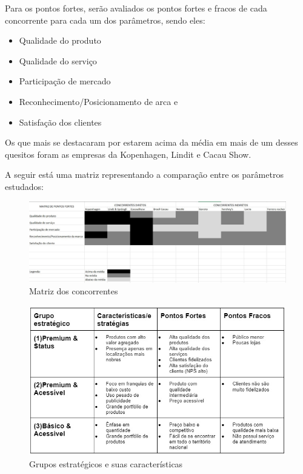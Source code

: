 \documentclass[
	12pt,				%
	openright,			%
	oneside,			%
	a4paper,			%
	english,			%
	french,				%
	spanish,			%
	brazil				%
	]{abntex2}
\begin{document}
Para os pontos fortes, serão avaliados os pontos fortes e fracos de cada concorrente para cada um dos parâmetros, sendo eles:
\begin{itemize}
\item Qualidade do produto
\item Qualidade do serviço
\item Participação de mercado
\item Reconhecimento/Posicionamento de arca e
\item Satisfação dos clientes
\end{itemize}
Os que mais se destacaram por estarem acima da média em mais de um desses quesitos foram as empresas da Kopenhagen, Lindit e Cacau Show.

A seguir está uma matriz representando a comparação entre os parâmetros estudados:

\begin{figure}[H]
\begin{center}
\caption{Matriz dos concorrentes}
\includegraphics[scale=0.3]{concorrentes2.jpeg} 
\end{center}
\end{figure}

\begin{figure}[H]
\begin{center}
\caption{Grupos estratégicos e suas características}
\includegraphics[scale=0.5]{WhatsApp Image 2022-08-19 at 18.59.03.jpeg} 
\end{center}
\end{figure}
\end{document}
